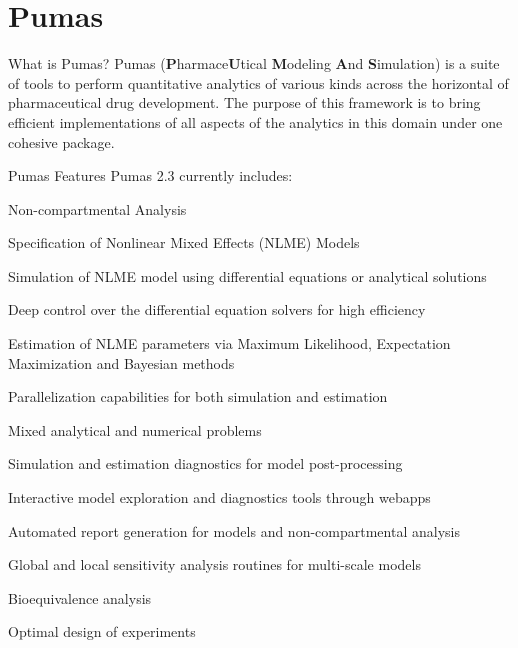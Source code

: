 
\section{Pumas}
\begin{frame}{What is Pumas?}
    Pumas (\textbf{P}harmace\textbf{U}tical \textbf{M}odeling \textbf{A}nd \textbf{S}imulation)
    \parencite{rackauckas2020accelerated}
    is a suite of tools to perform quantitative analytics of various kinds
    across the horizontal of pharmaceutical drug development.
    The purpose of this framework is to bring efficient implementations of
    all aspects of the analytics in this domain under one cohesive package.
\end{frame}

\begin{frame}{Pumas Features}
    Pumas 2.3 currently includes:
    \begin{vfilleditems}
        \small
        \item Non-compartmental Analysis
        \item Specification of Nonlinear Mixed Effects (NLME) Models
        \item Simulation of NLME model using differential equations or analytical solutions
        \item Deep control over the differential equation solvers for high efficiency
        \item Estimation of NLME parameters via Maximum Likelihood, Expectation Maximization and Bayesian methods
        \item Parallelization capabilities for both simulation and estimation
        \item Mixed analytical and numerical problems
        \item Simulation and estimation diagnostics for model post-processing
        \item Interactive model exploration and diagnostics tools through webapps
        \item Automated report generation for models and non-compartmental analysis
        \item Global and local sensitivity analysis routines for multi-scale models
        \item Bioequivalence analysis
        \item Optimal design of experiments
    \end{vfilleditems}
\end{frame}